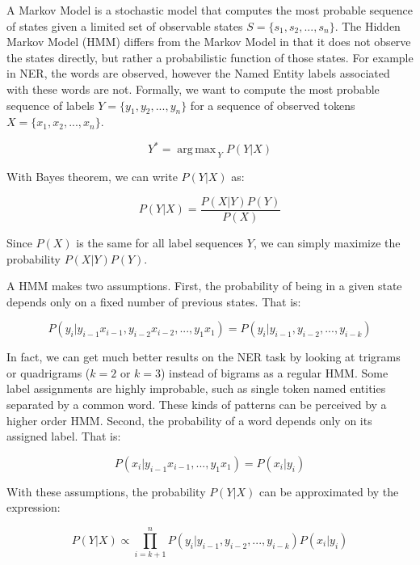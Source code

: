 \documentclass{nle}
\DeclareMathOperator*{\argmax}{arg\,max\,}
\begin{document}
A Markov Model is a stochastic model that computes the most probable sequence of states 
given a limited set of observable states $ S = \{s_1, s_2, ..., s_n \} $.
The Hidden Markov Model (HMM) differs from the Markov Model in that it
does not observe the states directly, but rather a probabilistic function of those 
states. For example in NER, the words are observed, however the Named Entity labels
associated with these words are not. Formally, we want to compute the most probable
sequence of labels $ Y = \{y_1, y_2, ..., y_n\} $ for a sequence of observed tokens
$ X = \{x_1, x_2, ..., x_n\} $.

\begin{equation}
Y^* = \argmax_{Y} P(Y|X)
\end{equation}

With Bayes theorem, we can write $ P(Y|X) $ as:

\begin{equation}
P(Y|X) = \frac{P(X|Y) P(Y)}{P(X)}
\end{equation}

Since $ P(X) $ is the same for all label sequences $ Y $, we can simply maximize
the probability $ P(X|Y) P(Y) $.

A HMM makes two assumptions. First, the probability of being in a given state depends 
only on a fixed number of previous states. That is:

\begin{equation}
P(y_i|y_{i-1}x_{i-1}, y_{i-2}x_{i-2}, ..., y_1x_1) = P(y_i|y_{i-1}, y_{i-2},..., y_{i-k})
\end{equation}

In fact, we can get much better results on the NER task by looking at trigrams
or quadrigrams ($ k = 2 $ or $ k = 3 $) instead of bigrams as a regular HMM. 
Some label assignments are highly improbable, such as single token named entities 
separated by a common word. These kinds of patterns can be perceived by a higher order HMM.
Second, the probability of a word depends only on its assigned label. That is:

\begin{equation}
P(x_i|y_{i-1}x_{i-1}, ..., y_1x_1) = P(x_i|y_i)
\end{equation}

With these assumptions, 
the probability $ P(Y|X) $ can be approximated by the expression:

\begin{equation}
P(Y|X) \propto \prod_{i=k+1}^{n} P(y_i|y_{i-1}, y_{i-2}, ..., y_{i-k}) P(x_i|y_i)
\end{equation}
\end{document}
